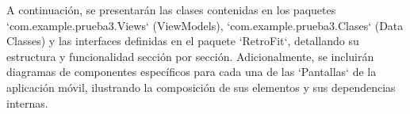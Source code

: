 A continuación, se presentarán las clases contenidas en los paquetes `com.example.prueba3.Views` (ViewModels), `com.example.prueba3.Clases` (Data Classes) y las interfaces definidas en el paquete `RetroFit`, detallando su estructura y funcionalidad sección por sección. Adicionalmente, se incluirán diagramas de componentes específicos para cada una de las `Pantallas` de la aplicación móvil, ilustrando la composición de sus elementos y sus dependencias internas.

\newpage